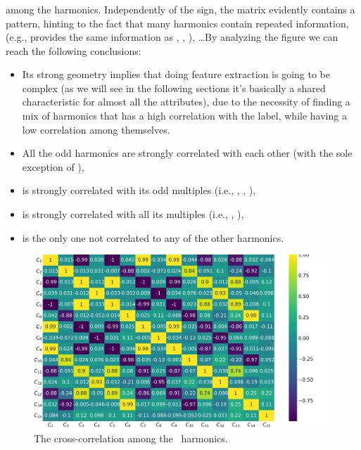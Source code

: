 \subsubsection{\an}
 among the harmonics. Independently of the sign, the matrix evidently contains a
pattern, hinting to the fact that many harmonics contain repeated information, (e.g., \an[1] provides
the same information as \an[3], \an[5], \an[7]), \ldots By analyzing the figure we can reach the
following conclusions:
\begin{itemize}
	\item Its strong geometry implies that doing feature extraction is going to be complex (as
	      we will see in the following sections it's basically a shared characteristic for
	      almost all the attributes), due to the necessity of finding a mix of harmonics that has a high correlation with the label, while having a low correlation among themselves.
	\item All the odd harmonics are strongly correlated with each other (with the sole exception
	      of \an[15]),
	\item \an[2] is strongly correlated with its odd multiples (i.e., \an[6], \an[10], \an[14]),
	\item \an[4] is strongly correlated with all its multiples (i.e., \an[8], \an[12]),
	\item \an[15] is the only one not correlated to any of the other harmonics.
\end{itemize}
\begin{figure}[!ht]
	\centering
	\includegraphics[width=\linewidth]{img/An_corr_matrix.png}
	\caption{The cross-correlation among the \an\ harmonics.} \label{fig:an-corr}
\end{figure}

